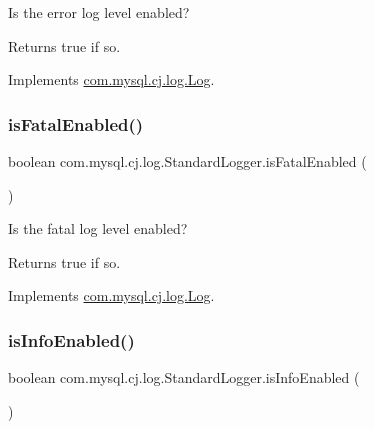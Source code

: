Is the \textquotesingle{}error\textquotesingle{} log level enabled?

\begin{DoxyReturn}{Returns}
true if so. 
\end{DoxyReturn}


Implements \mbox{\hyperlink{interfacecom_1_1mysql_1_1cj_1_1log_1_1_log_abda4b698026fdb26c74b211b521628c9}{com.\+mysql.\+cj.\+log.\+Log}}.

\mbox{\label{classcom_1_1mysql_1_1cj_1_1log_1_1_standard_logger_a622ab5114bddae2c0893a08e53c66cff}} 
\subsubsection{\texorpdfstring{is\+Fatal\+Enabled()}{isFatalEnabled()}}
{\footnotesize\ttfamily boolean com.\+mysql.\+cj.\+log.\+Standard\+Logger.\+is\+Fatal\+Enabled (\begin{DoxyParamCaption}{ }\end{DoxyParamCaption})}

Is the \textquotesingle{}fatal\textquotesingle{} log level enabled?

\begin{DoxyReturn}{Returns}
true if so. 
\end{DoxyReturn}


Implements \mbox{\hyperlink{interfacecom_1_1mysql_1_1cj_1_1log_1_1_log_a61464d2603e609442da19c59c5c62f62}{com.\+mysql.\+cj.\+log.\+Log}}.

\mbox{\label{classcom_1_1mysql_1_1cj_1_1log_1_1_standard_logger_afa3c624bf9920c0131a8d0581c571ef8}} 
\subsubsection{\texorpdfstring{is\+Info\+Enabled()}{isInfoEnabled()}}
{\footnotesize\ttfamily boolean com.\+mysql.\+cj.\+log.\+Standard\+Logger.\+is\+Info\+Enabled (\begin{DoxyParamCaption}{ }\end{DoxyParamCaption})}

